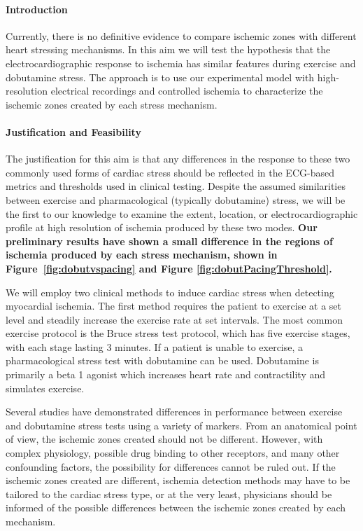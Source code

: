  \paragraph{Introduction} Currently, there is no definitive evidence to compare ischemic zones with different heart stressing mechanisms. In this aim we will test the hypothesis that the electrocardiographic response to ischemia has similar features during exercise and dobutamine stress. The approach is to use our experimental model  with high-resolution electrical recordings and  controlled ischemia to characterize the ischemic zones created by each stress mechanism. 

\paragraph{Justification and Feasibility} The justification for this aim is that any differences in the response to these two commonly used forms of cardiac stress should be reflected in the ECG-based metrics and thresholds used in clinical testing.  Despite the assumed similarities between exercise and pharmacological (typically dobutamine) stress, we will be the first to our knowledge to examine the extent, location, or electrocardiographic profile at high resolution of ischemia produced by these two modes. \textbf{Our preliminary results have shown a small difference in the regions of ischemia produced by each stress mechanism, shown in  Figure~\ref{fig:dobutvspacing} and Figure \ref{fig:dobutPacingThreshold}.}

 We will employ two clinical methods to induce cardiac stress when detecting myocardial ischemia. The first method requires the patient to exercise at a set level and steadily  increase the exercise rate at set intervals.\cite{BLZ:Oki1986} The most common exercise protocol is the Bruce stress test protocol, which has five exercise stages, with each stage lasting 3 minutes.\cite{BLZ:GOL1976,BLZ:Bru1963,BLZ:Oki1986} If a patient is unable to exercise, a pharmacological stress test with dobutamine can be used.\cite{BLZ:SAL1992,BLZ:Gre1997,BLZ:Man1988} Dobutamine is primarily a beta 1 agonist which increases heart rate and contractility and simulates exercise. 

Several studies have demonstrated differences in performance between exercise and dobutamine stress tests using a variety of markers.  From an anatomical point of view, the ischemic zones created should not be different. However, with complex physiology, possible drug binding to other receptors, and many other confounding factors, the possibility for differences cannot be ruled out. If the ischemic zones created are different, ischemia detection methods may have to be tailored to the cardiac stress type, or at the very least, physicians should be informed of the possible differences between the ischemic zones created by each mechanism.  

